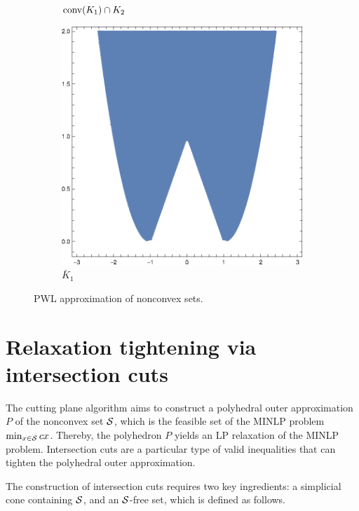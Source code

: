 \begin{figure}
\begin{subfigure}[b]{0.19\textwidth}
         \caption{$\operatorname{conv}(K_1) \cap K_2$}
        \label{fig.pwl.Khull}
 \end{subfigure}
  \hfill
   \begin{subfigure}[b]{0.19\textwidth}
         \centering
         \includegraphics[width=\textwidth]{Chapter2/media/Kpwl.eps}
         \caption{$\bar{K}_1$}
        \label{fig.pwl.Kpwl}
 \end{subfigure}
  \caption{PWL approximation of nonconvex sets.}
  \label{fig.pwl}
\end{figure}




\section{Relaxation tightening via intersection cuts}
\label{sec.premic}
The cutting plane algorithm aims to construct a polyhedral outer approximation $P$ of the nonconvex set $\mathcal S$, which is the feasible set of the MINLP problem $\min_{x \in \mathcal S} c x$. Thereby, the polyhedron $P$ yields an LP relaxation of the MINLP problem.  Intersection cuts are a particular type of  valid inequalities that can tighten the polyhedral outer approximation.


The construction of intersection cuts \cite{conforti2014} requires two key ingredients: a simplicial cone containing  $\mathcal S$, and an $\mathcal S$-free set, which is defined as follows.

